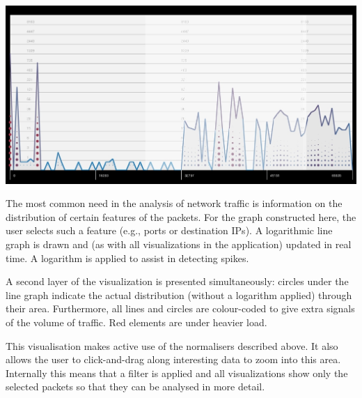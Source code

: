 \includegraphics[width=\linewidth]{materials/distribution.jpg}

The most common need in the analysis of network traffic is information on the distribution of certain features of the packets. For the graph constructed here, the user selects such a feature (e.g., ports or destination IPs). A logarithmic line graph is drawn and (as with all visualizations in the application) updated in real time. A logarithm is applied to assist in detecting spikes.

A second layer of the visualization is presented simultaneously: circles under the line graph indicate the actual distribution (without a logarithm applied) through their area. Furthermore, all lines and circles are colour-coded to give extra signals of the volume of traffic. Red elements are under heavier load.

This visualisation makes active use of the normalisers described above. It also allows the user to click-and-drag along interesting data to zoom into this area. Internally this means that a filter is applied and all visualizations show only the selected packets so that they can be analysed in more detail.